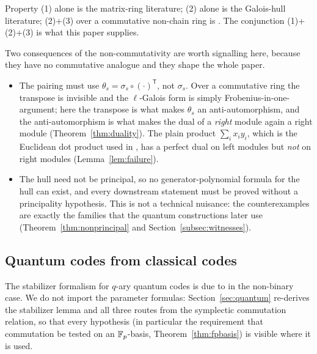 Property (1) alone is the matrix-ring literature; (2) alone is the Galois-hull
literature; (2)+(3) over a commutative non-chain ring is
\cite{ZhangKongZheng2026QuantumGaloisHulls}. The conjunction (1)+(2)+(3) is
what this paper supplies.

Two consequences of the non-commutativity are worth signalling here, because
they have no commutative analogue and they shape the whole paper.

\begin{itemize}
\item The pairing must use $\theta_s=\sigma_s\circ(\cdot)^{\mathsf T}$, not
  $\sigma_s$. Over a commutative ring the transpose is invisible and the
  $\ell$-Galois form is simply Frobenius-in-one-argument; here the transpose is
  what makes $\theta_s$ an anti-automorphism, and the anti-automorphism is what
  makes the dual of a \emph{right} module again a right module
  (Theorem~\ref{thm:duality}). The plain product $\sum_ix_iy_i$, which is the
  Euclidean dot product used in \cite{Alahmadi2013CyclicM2F2}, has a perfect
  dual on left modules but \emph{not} on right modules
  (Lemma~\ref{lem:failure}).
\item The hull need not be principal, so no generator-polynomial formula for
  the hull can exist, and every downstream statement must be proved without a
  principality hypothesis. This is not a technical nuisance: the
  counterexamples are exactly the families that the quantum constructions later
  use (Theorem~\ref{thm:nonprincipal} and Section~\ref{subsec:witnesses}).
\end{itemize}

\subsection{Quantum codes from classical codes}

The stabilizer formalism for $q$-ary quantum codes is due to
\cite{KetkarEtAl2006NonbinaryStabilizer} in the non-binary case. We do not
import the parameter formulas: Section~\ref{sec:quantum} re-derives the
stabilizer lemma and all three routes from the symplectic commutation relation,
so that every hypothesis (in particular the requirement that commutation be
tested on an $\mathbb F_p$-basis, Theorem~\ref{thm:fpbasis}) is visible where it is
used.
